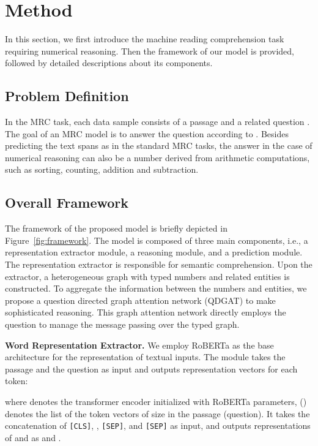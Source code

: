 \documentclass{article}
\begin{document}
\section{Method}
In this section, we first introduce the machine reading comprehension task requiring numerical reasoning. Then the framework of our model is provided, followed by detailed descriptions about its components.

\subsection{Problem Definition}
In the MRC task, each data sample consists of a passage  and a related question .
The goal of an MRC model is to answer the question according to .
Besides predicting the text spans as in the standard MRC tasks, the answer  in the case of numerical reasoning can also be a number derived from arithmetic computations, such as sorting, counting, addition and subtraction.





\subsection{Overall Framework}
The framework of the proposed model is briefly depicted in Figure~\ref{fig:framework}.
The model is composed of three main components, i.e., a representation extractor module, a reasoning module, and a prediction module.
The representation extractor is responsible for semantic comprehension.
Upon the extractor, a heterogeneous graph with typed numbers and related entities is constructed.
To aggregate the information between the numbers and entities, we propose a question directed graph attention network (QDGAT) to make sophisticated reasoning.
This graph attention network directly employs the question  to manage the message passing over the typed graph.


{\bf Word Representation Extractor.}
We employ RoBERTa \cite{DBLP:journals/corr/abs-1907-11692} as the base architecture for the representation of textual inputs.
The module takes the passage  and the question  as input and outputs representation vectors for each token:

where  denotes the transformer encoder initialized with RoBERTa  parameters, 
 () denotes the list of the token vectors of size  in the passage (question).
It takes the concatenation of \texttt{[CLS]}, , \texttt{[SEP]},  and \texttt{[SEP]} as input, and outputs representations of  and  as  and .  
\end{document}
